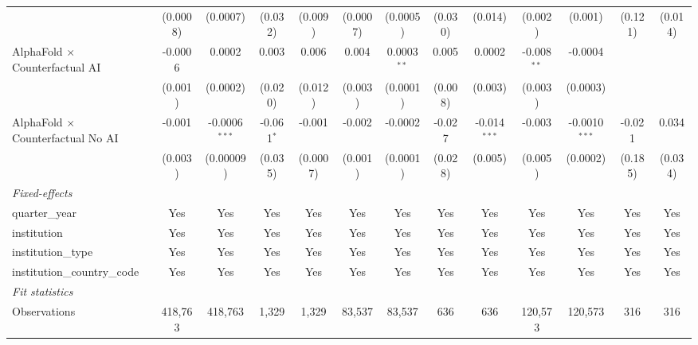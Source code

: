 \begin{tabular}{lcccccccccccc}
                                            & (0.0008)      & (0.0007)        & (0.032)      & (0.009)  & (0.0007)        & (0.0005)       & (0.030) & (0.014)        & (0.002)       & (0.001)         & (0.121) & (0.014)\\   
   AlphaFold $\times$ Counterfactual AI     & -0.0006       & 0.0002          & 0.003        & 0.006    & 0.004           & 0.0003$^{**}$  & 0.005   & 0.0002         & -0.008$^{**}$ & -0.0004         &         &   \\   
                                            & (0.001)       & (0.0002)        & (0.020)      & (0.012)  & (0.003)         & (0.0001)       & (0.008) & (0.003)        & (0.003)       & (0.0003)        &         &   \\   
   AlphaFold $\times$ Counterfactual No AI  & -0.001        & -0.0006$^{***}$ & -0.061$^{*}$ & -0.001   & -0.002          & -0.0002        & -0.027  & -0.014$^{***}$ & -0.003        & -0.0010$^{***}$ & -0.021  & 0.034\\   
                                            & (0.003)       & (0.00009)       & (0.035)      & (0.0007) & (0.001)         & (0.0001)       & (0.028) & (0.005)        & (0.005)       & (0.0002)        & (0.185) & (0.034)\\   
   \midrule
   \emph{Fixed-effects}\\
   quarter\_year                            & Yes           & Yes             & Yes          & Yes      & Yes             & Yes            & Yes     & Yes            & Yes           & Yes             & Yes     & Yes\\  
   institution                              & Yes           & Yes             & Yes          & Yes      & Yes             & Yes            & Yes     & Yes            & Yes           & Yes             & Yes     & Yes\\  
   institution\_type                        & Yes           & Yes             & Yes          & Yes      & Yes             & Yes            & Yes     & Yes            & Yes           & Yes             & Yes     & Yes\\  
   institution\_country\_code               & Yes           & Yes             & Yes          & Yes      & Yes             & Yes            & Yes     & Yes            & Yes           & Yes             & Yes     & Yes\\  
   \midrule
   \emph{Fit statistics}\\
   Observations                             & 418,763       & 418,763         & 1,329        & 1,329    & 83,537          & 83,537         & 636     & 636            & 120,573       & 120,573         & 316     & 316\\  

\end{tabular}
